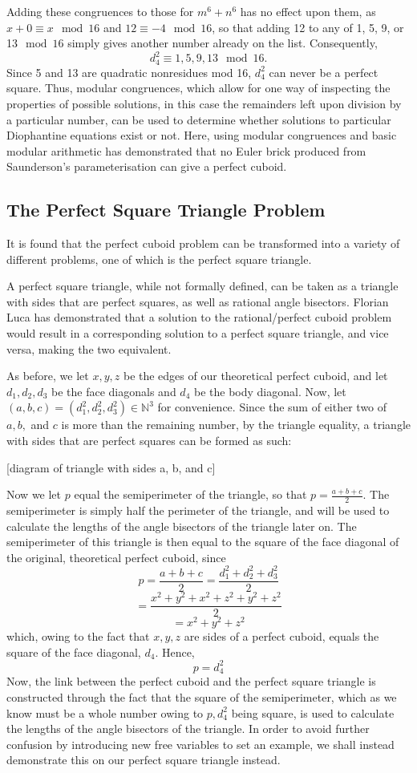 \documentclass[11pt]{article}
\begin{document}
Adding these congruences to those for $m^6+n^6$ has no effect upon them, as $x+0\equiv{x}\mod{16}$ and $12\equiv{-4}\mod{16}$, so that adding 12 to any of 1, 5, 9, or 13$\mod{16}$ simply gives another number already on the list. Consequently, 
$$d_4^2\equiv{1, 5, 9, 13}\mod{16}.$$
Since 5 and 13 are quadratic nonresidues mod 16, $d_4^2$ can never be a perfect square. Thus, modular congruences, which allow for one way of inspecting the properties of possible solutions, in this case the remainders left upon division by a particular number, can be used to determine whether solutions to particular Diophantine equations exist or not. Here, using modular congruences and basic modular arithmetic has demonstrated that no Euler brick produced from Saunderson's parameterisation can give a perfect cuboid.

\subsection{The Perfect Square Triangle Problem}
It is found that the perfect cuboid problem can be transformed into a variety of different problems, one of which is the perfect square triangle.

A perfect square triangle, while not formally defined, can be taken as a triangle with sides that are perfect squares, as well as rational angle bisectors. Florian Luca has demonstrated that a solution to the rational/perfect cuboid problem would result in a corresponding solution to a perfect square triangle, and vice versa, making the two equivalent.\cite{luca}

As before, we let $x, y, z$ be the edges of our theoretical perfect cuboid, and let $d_1, d_2, d_3$ be the face diagonals and $d_4$ be the body diagonal. Now, let $(a, b, c)=(d_1^2, d_2^2, d_3^2)\in{\mathbb{N}^3}$ for convenience. Since the sum of either two of $a, b,$ and $c$ is more than the remaining number, by the triangle equality, a triangle with sides that are perfect squares can be formed as such:

[diagram of triangle with sides a, b, and c] 

Now we let $p$ equal the semiperimeter of the triangle, so that $p=\frac{a+b+c}{2}$. The semiperimeter is simply half the perimeter of the triangle, and will be used to calculate the lengths of the angle bisectors of the triangle later on. The semiperimeter of this triangle is then equal to the square of the face diagonal of the original, theoretical perfect cuboid, since
$$p=\frac{a+b+c}{2}=\frac{d_1^2+d_2^2+d_3^2}{2}$$
$$=\frac{x^2+y^2+x^2+z^2+y^2+z^2}{2}$$
$$=x^2+y^2+z^2$$
which, owing to the fact that $x, y, z$ are sides of a perfect cuboid, equals the square of the face diagonal, $d_4$. Hence,
$$p=d_4^2$$
Now, the link between the perfect cuboid and the perfect square triangle is constructed through the fact that the square of the semiperimeter, which as we know must be a whole number owing to $p, d_4^2$ being square, is used to calculate the lengths of the angle bisectors of the triangle. In order to avoid further confusion by introducing new free variables to set an example, we shall instead demonstrate this on our perfect square triangle instead. 
\end{document}

